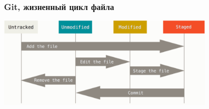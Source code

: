 \documentclass{../slides-style}
\begin{document}
    \begin{frame}
        \frametitle{Git, жизненный цикл файла}
        \begin{center}
            \includegraphics[width=0.8\textwidth]{fileLifeCycle.png}
        \end{center}
    \end{frame}
\end{document}
